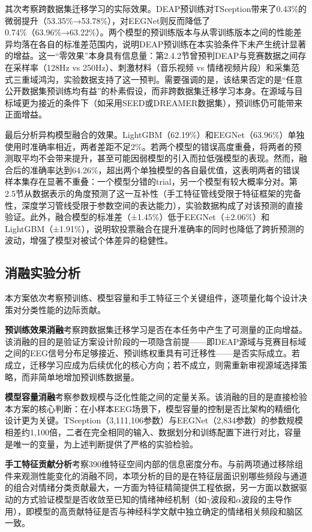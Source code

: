 \documentclass[UTF8,zihao=-4,fontset=windows]{ctexart}
\numberwithin{equation}{section}
\numberwithin{figure}{section}
\numberwithin{table}{section}
\begin{document}
其次考察跨数据集迁移学习的实际效果。DEAP预训练对TSception带来了0.43\%的微弱提升（53.35\%→53.78\%），对EEGNet则反而降低了0.74\%（63.96\%→63.22\%）。两个模型的预训练版本与从零训练版本之间的性能差异均落在各自的标准差范围内，说明DEAP预训练在本实验条件下未产生统计显著的增益。这一“零效果”本身具有信息量：第2.4.2节曾预判DEAP与竞赛数据之间存在采样率（128Hz vs 250Hz）、刺激材料（音乐视频 vs 情绪视频片段）和采集范式三重域鸿沟，实验数据支持了这一预判。需要强调的是，该结果否定的是“任意公开数据集预训练均有益”的朴素假设，而非跨数据集迁移学习本身。在源域与目标域更为接近的条件下（如采用SEED或DREAMER数据集），预训练仍可能带来正面增益。

最后分析异构模型融合的效果。LightGBM（62.19\%）和EEGNet（63.96\%）单独使用时准确率相近，两者差距不足2\%。若两个模型的错误高度重叠，将两者的预测取平均不会带来提升，甚至可能因弱模型的引入而拉低强模型的表现。然而，融合后的准确率达到64.26\%，超出两个单独模型的各自最优值，这表明两者的错误样本集存在显著不重叠：一个模型分错的trial，另一个模型有较大概率分对。第2.5节从数据表示的角度预测了这一互补性（手工特征管线受限于特征框架的完备性，深度学习管线受限于参数空间的表达能力），实验数据构成了对该预测的直接验证。此外，融合模型的标准差（±1.45\%）低于EEGNet（±2.06\%）和LightGBM（±1.91\%），说明软投票融合在提升准确率的同时也降低了跨折预测的波动，增强了模型对被试个体差异的稳健性。

\subsection{消融实验分析}

本方案依次考察预训练、模型容量和手工特征三个关键组件，逐项量化每个设计决策对分类性能的边际贡献。

\textbf{预训练效果消融}考察跨数据集迁移学习是否在本任务中产生了可测量的正向增益。该消融的目的是验证方案设计阶段的一项隐含前提——即DEAP源域与竞赛目标域之间的EEG信号分布足够接近、预训练权重具有可迁移性——是否实际成立。若成立，迁移学习应成为后续优化的核心方向；若不成立，则需重新审视源域选择策略，而非简单地增加预训练数据量。

\textbf{模型容量消融}考察参数规模与泛化性能之间的定量关系。该消融的目的是直接检验本方案的核心判断：在小样本EEG场景下，模型容量的控制是否比架构的精细化设计更为关键。TSception（3,111,106参数）与EEGNet（2,834参数）的参数规模相差约1,100倍，二者在完全相同的输入、数据划分和训练配置下进行对比，容量是唯一的变量，为上述判断提供了严格的实验检验。

\textbf{手工特征贡献分析}考察390维特征空间内部的信息密度分布。与前两项通过移除组件来观测性能变化的消融不同，本项分析的目的是在特征层面识别哪些频段与通道的组合对情绪分类贡献最大，一方面为特征精简提供工程依据，另一方面以数据驱动的方式验证模型是否收敛至已知的情绪神经机制（如$\gamma$波段和$\alpha$波段的主导作用），即模型的高贡献特征是否与神经科学文献中独立确定的情绪相关频段和脑区一致。
\end{document}
